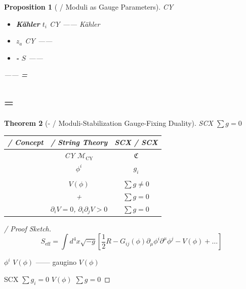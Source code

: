 \documentclass[12pt,a4paper]{article}
\theoremstyle{plain}
\newtheorem{theorem}{ Theorem}[section]
\newtheorem{proposition}[theorem]{ Proposition}
\theoremstyle{definition}
\newcommand{\M}{\mathcal{M}}
\newcommand{\ClaimSpace}{\mathfrak{C}}
\begin{document}
\begin{proposition}[ / Moduli as Gauge Parameters]
CY \textbf{}
\begin{itemize}
    \item \textbf{Kähler } $t_i$ CY  ——  Kähler 
    \item \textbf{} $z_a$ CY  —— 
    \item \textbf{-} $S$ —— 
\end{itemize}

\textbf{}——
\textbf{ = }
\end{proposition}


\subsection{ = }

\begin{theorem}[- / Moduli-Stabilization Gauge-Fixing Duality]
\label{thm:moduli_gauge}
 SCX  $\sum g = 0$ 

\begin{center}
\begin{tabular}{c|c|c}
    \toprule
    \textbf{ / Concept} & \textbf{ / String Theory} & \textbf{SCX / SCX} \\
    \midrule
     & CY  $\M_{\text{CY}}$ &  $\ClaimSpace$ \\
     &  $\phi^i$ &  $g_i$ \\
     &  &  \\
     & $V(\phi)$  & $\sum g \neq 0$  \\
     &  +  & $\sum g = 0$  \\
     & $\partial_i V = 0$, $\partial_i\partial_j V > 0$ & $\sum g = 0$  \\
    \bottomrule
\end{tabular}
\end{center}
\end{theorem}

\begin{proof}[ / Proof Sketch]

\begin{equation}
    S_{\text{eff}} = \int d^4x \sqrt{-g} \left[ \frac{1}{2}R - G_{ij}(\phi)\partial_\mu\phi^i\partial^\mu\phi^j - V(\phi) + \ldots \right]
\end{equation}

 $\phi^i$  $V(\phi)$ ——\textbf{}
gaugino  $V(\phi)$ 


 SCX $\sum g_i = 0$ \textbf{}
 $V(\phi)$  $\sum g = 0$ 
\end{proof}
\end{document}
